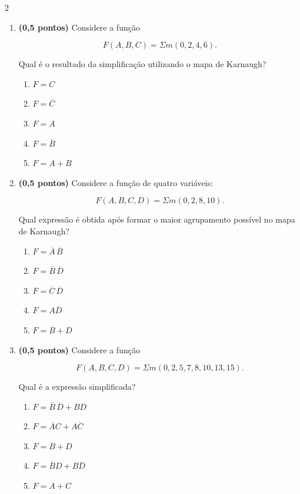 \documentclass[a4paper,12pt]{article}
\begin{document}
\begin{multicols}{2}
\begin{enumerate}[leftmargin=*]
\item \textbf{(0,5 pontos)} Considere a função

\[
F(A,B,C)=\Sigma m(0,2,4,6).
\]

Qual é o resultado da simplificação utilizando o mapa de Karnaugh?

\begin{enumerate}[label=(\Alph*)]
    \item $F=C$
    \item $F=\overline{C}$
    \item $F=A$
    \item $F=\overline{B}$
    \item $F=A+B$
\end{enumerate}

\vspace{0.2cm}


\item \textbf{(0,5 pontos)} Considere a função de quatro variáveis:

\[
F(A,B,C,D)=\Sigma m(0,2,8,10).
\]

Qual expressão é obtida após formar o maior agrupamento possível no mapa
de Karnaugh?

\begin{enumerate}[label=(\Alph*)]
    \item $F=\overline{A}\,\overline{B}$
    \item $F=\overline{B}\,\overline{D}$
    \item $F=\overline{C}\,\overline{D}$
    \item $F=A\overline{D}$
    \item $F=\overline{B}+D$
\end{enumerate}

\vspace{0.2cm}


\item \textbf{(0,5 pontos)} Considere a função

\[
F(A,B,C,D)=
\Sigma m(0,2,5,7,8,10,13,15).
\]

Qual é a expressão simplificada?

\begin{enumerate}[label=(\Alph*)]
    \item $F=\overline{B}\,\overline{D}+BD$
    \item $F=\overline{A}C+A\overline{C}$
    \item $F=B+D$
    \item $F=\overline{B}D+B\overline{D}$
    \item $F=A+C$
\end{enumerate}


\end{enumerate}
\end{multicols}
\end{document}

